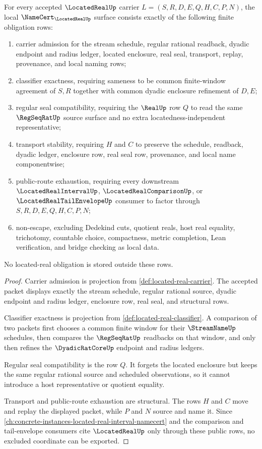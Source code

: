 \begin{theorem}
\label{thm:located-real-namecert-obligations}
For every accepted $\LocatedRealUp$ carrier $L=(S,R,D,E,Q,H,C,P,N)$, the local $\NameCert_{\LocatedRealUp}$ surface consists exactly of the following finite obligation rows:
\begin{enumerate}
\item carrier admission for the stream schedule, regular rational readback, dyadic endpoint and radius ledger, located enclosure, real seal, transport, replay, provenance, and local naming rows;
\item classifier exactness, requiring sameness to be common finite-window agreement of $S,R$ together with common dyadic enclosure refinement of $D,E$;
\item regular seal compatibility, requiring the $\RealUp$ row $Q$ to read the same $\RegSeqRatUp$ source surface and no extra locatedness-independent representative;
\item transport stability, requiring $H$ and $C$ to preserve the schedule, readback, dyadic ledger, enclosure row, real seal row, provenance, and local name componentwise;
\item public-route exhaustion, requiring every downstream $\LocatedRealIntervalUp$, $\LocatedRealComparisonUp$, or $\LocatedRealTailEnvelopeUp$ consumer to factor through $S,R,D,E,Q,H,C,P,N$;
\item non-escape, excluding Dedekind cuts, quotient reals, host real equality, trichotomy, countable choice, compactness, metric completion, Lean verification, and bridge checking as local data.
\end{enumerate}
No located-real obligation is stored outside these rows.
\end{theorem}
\begin{proof}
Carrier admission is projection from \autoref{def:located-real-carrier}. The accepted packet displays exactly the stream schedule, regular rational source, dyadic endpoint and radius ledger, enclosure row, real seal, and structural rows.

Classifier exactness is projection from \autoref{def:located-real-classifier}. A comparison of two packets first chooses a common finite window for their $\StreamNameUp$ schedules, then compares the $\RegSeqRatUp$ readbacks on that window, and only then refines the $\DyadicRatCoreUp$ endpoint and radius ledgers.

Regular seal compatibility is the row $Q$. It forgets the located enclosure but keeps the same regular rational source and scheduled observations, so it cannot introduce a host representative or quotient equality.

Transport and public-route exhaustion are structural. The rows $H$ and $C$ move and replay the displayed packet, while $P$ and $N$ source and name it. Since \autoref{ch:concrete-instances-located-real-interval-namecert} and the comparison and tail-envelope consumers cite $\LocatedRealUp$ only through these public rows, no excluded coordinate can be exported.
\end{proof}

